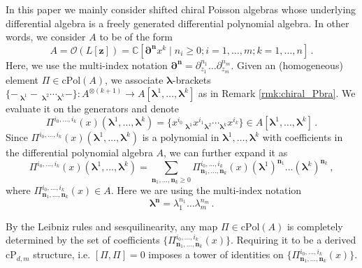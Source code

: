 \documentclass[11pt]{article}
\numberwithin{equation}{section}
\begin{document}
In this paper we mainly consider shifted chiral Poisson algebras whose underlying differential algebra is a freely generated differential polynomial algebra. In other words, we consider $A$ to be of the form
 \begin{equation}
	 A = \mathcal{O}(L[\boldsymbol{z}])= \mathbb{C}[\boldsymbol{\partial}^{\boldsymbol{n}}x^k\mid n_i \geq 0;i = 1,\dots,m; k = 1,\dots,n]\,.
 \end{equation}
  Here, we use the multi-index notation $\boldsymbol{\partial}^{\boldsymbol{n}} = \partial_{z_1}^{n_1}\dots\partial_{z_m}^{n_m}$. Given an (homogeneous) element $\Pi \in \mathrm{cPol}(A)$, we associate $\boldsymbol{\lambda}$-brackets $\{-~\!_{\boldsymbol{\lambda}^1}-~\!_{\boldsymbol{\lambda}^2}\cdots_{\boldsymbol{\lambda}^{k}}-\}: A^{\otimes (k+1)} \to A[\boldsymbol{\lambda}^{1}, \dots, \boldsymbol{\lambda}^{k}]$ as in Remark \ref{rmk:chiral_Pbra}. We evaluate it on the generators and denote
 \begin{equation}
	\Pi^{i_0,\dots,i_{k}}(x)(\boldsymbol{\lambda}^1,\dots,\boldsymbol{\lambda}^{k}) = \{x^{i_0}~\!_{\boldsymbol{\lambda}^1}x^{i_1}\!_{\boldsymbol{\lambda}^2}\cdots_{\boldsymbol{\lambda}^{k}}x^{i_{k}}\} \in A[\boldsymbol{\lambda}^1,\dots,\boldsymbol{\lambda}^{k}]\,.
 \end{equation} 
 Since $\Pi^{i_0,\dots,i_{k}}(x)(\boldsymbol{\lambda}^1,\dots,\boldsymbol{\lambda}^{k})$ is a polynomial in $\boldsymbol{\lambda}^1,\dots,\boldsymbol{\lambda}^{k}$ with coefficients in the differential polynomial algebra $A$, we can further expand it as 
 \begin{equation}
	\Pi^{i_0,\dots,i_{k}}(x)(\boldsymbol{\lambda}^1,\dots,\boldsymbol{\lambda}^{k}) = \sum_{\boldsymbol{n}_1,\dots,\boldsymbol{n}_{k} \geq 0} \Pi^{i_0,\dots,i_{k}}_{\boldsymbol{n}_1,\dots,\boldsymbol{n}_{k}}(x) (\boldsymbol{\lambda}^1)^{\boldsymbol{n}_1}\dots(\boldsymbol{\lambda}^{k})^{\boldsymbol{n}_{k}}\,,
 \end{equation}
 where $\Pi^{i_0,\dots,i_{k}}_{\boldsymbol{n}_1,\dots,\boldsymbol{n}_{k}}(x) \in A$. Here we are using the multi-index notation 
 \begin{equation}
	\boldsymbol{\lambda}^{\boldsymbol{n}} = \lambda_1^{n_{1}}\dots\lambda_m^{n_{m}}\,.
 \end{equation}
 
 By the Leibniz rules and sesquilinearity, any map $\Pi \in\mathrm{cPol}(A)$ is completely determined by the set of coefficients $\{\Pi^{i_0,\dots,i_{k}}_{\boldsymbol{n}_1,\dots,\boldsymbol{n}_{k}}(x)\}$. Requiring it to be a derived $\mathrm{cP}_{d,m}$ structure, i.e. $[\Pi,\Pi] = 0$ imposes a tower of identities on $\{\Pi^{i_0,\dots,i_{k}}_{\boldsymbol{n}_1,\dots,\boldsymbol{n}_{k}}(x)\}$.
\end{document}
